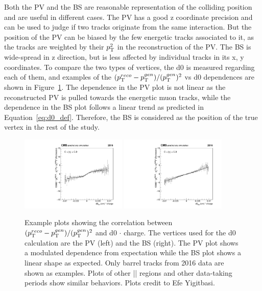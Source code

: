 Both the PV and the BS are reasonable representation of the colliding position and are useful in different cases.
The PV has a good z coordinate precision and can be used to judge if two tracks originate from the same interaction. 
But the position of the PV can be biased by the few energetic tracks associated to it, 
as the tracks are weighted by their $p_{\mathrm{T}}^{2}$ in the reconstruction of the PV.
The BS is wide-spread in z direction, but is less affected by individual tracks in its x, y coordinates.
To compare the two types of vertices, the d0 is measured regarding each of them, 
and examples of the $(p_{\mathrm{T}}^{reco}-p_{\mathrm{T}}^{gen})/ (p_{\mathrm{T}}^{gen})^{2}$ vs d0 dependences are shown in Figure~\ref{fig:pv_vs_bs_fits}.
The dependence in the PV plot is not linear as the reconstructed PV is pulled towards the energetic muon tracks,
while the dependence in the BS plot follows a linear trend as predicted in Equation~\ref{eq:d0_def}.
Therefore, the BS is considered as the position of the true vertex in the rest of the study.

\begin{figure}[!htb]
      \centering
      \captionsetup{justification=justified}
      \includegraphics[width=0.45\textwidth]{pics/muon_corr/GeoFit/fit_results/d0_pt_PV_eg.pdf}
      \includegraphics[width=0.45\textwidth]{pics/muon_corr/GeoFit/fit_results/d0_pt_BS_eg.pdf}
      \caption{Example plots showing the correlation between $(p_{\mathrm{T}}^{reco}-p_{\mathrm{T}}^{gen})/ (p_{\mathrm{T}}^{gen})^{2}$ and d0 $\cdot$ charge.
               The vertices used for the d0 calculation are the PV (left) and the BS (right). 
               The PV plot shows a modulated dependence from expectation while the BS plot shows a linear shape as expected.
               Only barrel tracks from 2016 data are shown as examples. 
               Plots of other |\eta| regions and other data-taking periods show similar behaviors.
               Plots credit to Efe Yigitbasi.}
      \label{fig:pv_vs_bs_fits}
\end{figure}

